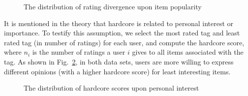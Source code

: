 \documentclass[sigconf]{acmart}
\begin{document}
\begin{figure}[htbp]
\centering
\centering
{}
\caption{The distribution of rating divergence upon item popularity}
\label{fig:popularity}
\end{figure}

It is mentioned in the theory\cite{Neolle-Neumann1993spiral} that hardcore is related to personal interest or importance. To testify this assumption, we select the most rated tag and least rated tag (in number of ratings) for each user, and compute the hardcore score, where $n_i$ is the number of ratings a user $i$ gives to all items associated with the tag.  As shown in Fig.~\ref{fig:personalinterest}, in both data sets, users are more willing to express different opinions (with a higher hardcore score) for least interesting items.

\begin{figure}[htbp]
\centering
\centering
{}
\caption{The distribution of hardcore scores upon personal interest}
\label{fig:personalinterest}
\end{figure}
\end{document}
